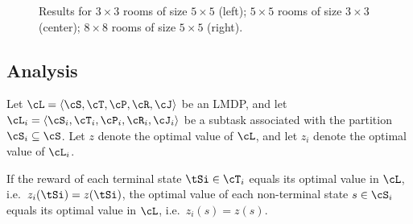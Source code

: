 

\begin{figure}[!htb]
\setlength{\belowcaptionskip}{-10pt}
\centering
\caption{ Results for $3\times 3$ rooms of size $5 \times 5$ (left);
$5\times 5$ rooms of size $3 \times 3$ (center); $8 \times 8$ rooms of size $5\times 5$ (right).}
\label{fig:hlmdps_errors_nrooms}
\end{figure}


\subsection{Analysis}
Let $\cL=\langle\cS,\cT,\cP,\cR,\cJ\rangle$ be an LMDP, and let $\cL_i=\langle\cS_i,\cT_i,\cP_i,\cR_i,\cJ_i\rangle$ be a subtask associated with the partition $\cS_i\subseteq\cS$. Let $z$ denote the optimal value of $\cL$, and let $z_i$ denote the optimal value of $\cL_i$.

\begin{lemma}\label{lemma:same}
If the reward of each terminal state $\tSi\in\cT_i$ equals its optimal value in $\cL$, i.e.~$z_i(\tSi)=z(\tSi)$, the optimal value of each non-terminal state $s\in\cS_i$ equals its optimal value in $\cL$, i.e.~$z_i(s)=z(s)$.
\end{lemma}

